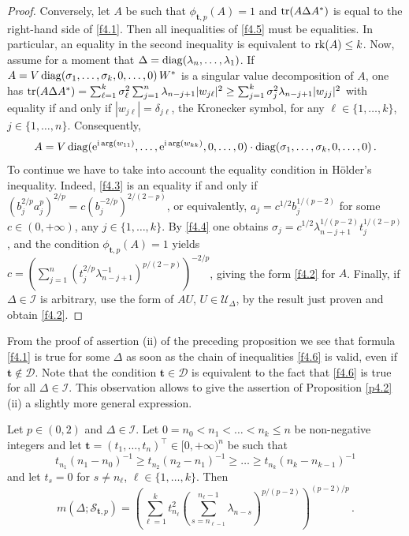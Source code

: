 \documentclass{amsart}
\begin{document}
\begin{proof}
Conversely, let $A$ be such that ${\phi}_{{\mathbf t},p}(A)=1$ and ${\rm tr}(A \Delta A^*)$ is equal to the right-hand side of \eqref{f4.1}. Then all inequalities of \ref{f4.5} must be equalities. In particular, an equality in the second inequality is equivalent to ${\rm rk}(A) \leq k$. Now, assume for a moment that $\Delta = {\rm diag}(\lambda_n, \ldots ,\lambda_1)$. If $A=V \, {\rm diag}(\sigma_1,\ldots,\sigma_k, 0,\ldots,0)\, W^*$ is a singular value decomposition of $A$, one has ${\rm tr}(A \Delta A^*) = \sum_{\ell=1}^k \sigma_\ell^2 \sum_{j=1}^n \lambda_{n-j+1} |w_{j\ell}|^2 \geq \sum_{j=1}^k \sigma_j^2 \lambda_{n-j+1} |w_{jj}|^2$ with equality if and only if $|w_{j\ell}|=\delta_{j\ell}$, the Kronecker symbol, for any $\ell \in \{ 1,\ldots,k\}$, $j \in \{ 1,\ldots,n\}$. Consequently, 
\[
A= V \, {\rm diag}({\rm e}^{{\rm i}\,{\rm arg}(w_{11})}, \ldots , {\rm e}^{{\rm i}\,{\rm arg}(w_{kk})}, 0,  \ldots , 0) \cdot {\rm diag}(\sigma_1,\ldots,\sigma_k,0,\ldots,0) \, .
\]
To continue we have to take into account the equality condition in H\"older's inequality. Indeed, \eqref{f4.3} is an equality if and only if $(b_j^{2/p}a_j^p)^{2/p} = c (b_j^{-2/p})^{2/(2-p)}$, or equivalently, $a_j = c^{1/2} b_j^{1/(p-2)}$ for some $c \in (0,+\infty)$, any $j \in \{ 1,\ldots,k\}$. By \eqref{f4.4} one obtains $\sigma_j=c^{1/2} \lambda_{n-j+1}^{1/(p-2)} t_j^{1/(2-p)}$, and the condition $\phi_{{\mathbf t}, p}(A)=1$ yields 
$c=\left( \sum_{j=1}^n (t_j^{2/p} \lambda_{n-j+1}^{-1})^{p/(2-p)}\right)^{-2/p}$, giving the form \eqref{f4.2} for $A$. Finally, if $\Delta \in {\mathcal I}$ is arbitrary, use the form of $AU$, $U \in {\mathcal U}_\Delta$, by the result just proven and obtain \eqref{f4.2}. 
\end{proof}

From the proof of assertion (ii) of the preceding proposition we see that formula \eqref{f4.1} is true for some $\Delta$ as soon as the chain of inequalities \eqref{f4.6} is valid, even if ${\mathbf t} \not\in {\mathcal D}$. Note that the condition ${\mathbf t} \in {\mathcal D}$ is equivalent to the fact that \eqref{f4.6} is true for all $\Delta \in {\mathcal I}$. This observation allows to give the assertion of Proposition \ref{p4.2}(ii) a slightly more general expression. 

\begin{cor} \label{c4.3}
   Let $p \in (0,2)$ and $\Delta \in \mathcal I$. Let $0=n_0 < n_1 < \ldots < n_k \leq n$  be non-negative integers and let ${\mathbf t}=(t_1,\ldots,t_n)^\top \in [0,+\infty)^n$ be such that 
 \begin{equation} \label{f4.7}
           t_{n_1}(n_1-n_0)^{-1} \geq t_{n_2}(n_2-n_1)^{-1} \geq \ldots \geq t_{n_k} (n_k-n_{k-1})^{-1}
\end{equation}
and let $t_s=0$ for $s \not=n_\ell$, $\ell \in \{ 1,\ldots,k\}$. Then 
\begin{equation} \label{f4.8}
           m(\Delta; {\mathcal S}_{{\mathbf t},p}) = \left(  \sum_{\ell=1}^k t_{n_\ell}^2 \left(  \sum_{s=n_{\ell-1}}^{n_\ell-1} \lambda_{n-s} \right)^{p/(p-2)} \right)^{(p-2)/p} \, .
\end{equation}
\end{cor}
           
\end{document}
